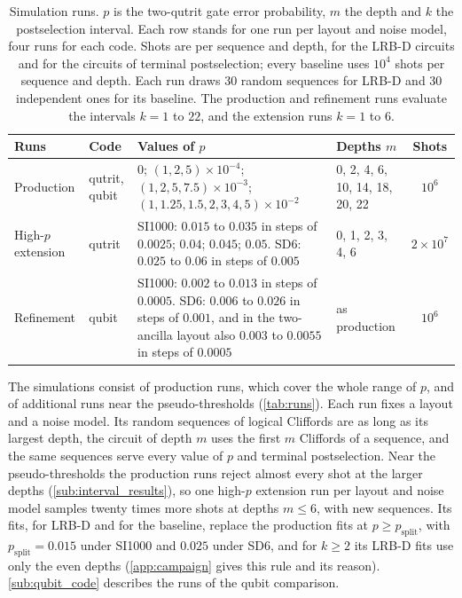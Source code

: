 \begin{table}[tb]
  \centering
  \small
  \begin{tabular}{l|l|p{6.0cm}|p{2.7cm}|c}
    \hline
    Runs & Code & Values of $p$ & Depths $m$ & Shots \\
    \hline
    Production & qutrit, qubit & $0$; $(1, 2, 5)\times10^{-4}$; $(1, 2, 5, 7.5)\times10^{-3}$; $(1, 1.25, 1.5, 2, 3, 4, 5)\times10^{-2}$ & 0, 2, 4, 6, 10, 14, 18, 20, 22 & $10^6$ \\
    High-$p$ extension & qutrit & SI1000: $0.015$ to $0.035$ in steps of $0.0025$; $0.04$; $0.045$; $0.05$. SD6: $0.025$ to $0.06$ in steps of $0.005$ & 0, 1, 2, 3, 4, 6 & $2\times10^7$ \\
    Refinement & qubit & SI1000: $0.002$ to $0.013$ in steps of $0.0005$. SD6: $0.006$ to $0.026$ in steps of $0.001$, and in the two-ancilla layout also $0.003$ to $0.0055$ in steps of $0.0005$ & as production & $10^6$ \\
    \hline
  \end{tabular}
  \caption{Simulation runs. $p$ is the two-qutrit gate error probability, $m$ the depth and $k$ the postselection interval. Each row stands for one run per layout and noise model, four runs for each code. Shots are per sequence and depth, for the LRB-D circuits and for the circuits of terminal postselection; every baseline uses $10^4$ shots per sequence and depth. Each run draws 30 random sequences for LRB-D and 30 independent ones for its baseline. The production and refinement runs evaluate the intervals $k = 1$ to $22$, and the extension runs $k = 1$ to $6$.}
  \label{tab:runs}
\end{table}

The simulations consist of production runs, which cover the whole range of $p$, and of additional runs near the pseudo-thresholds (\autoref{tab:runs}). Each run fixes a layout and a noise model. Its random sequences of logical Cliffords are as long as its largest depth, the circuit of depth $m$ uses the first $m$ Cliffords of a sequence, and the same sequences serve every value of $p$ and terminal postselection. Near the pseudo-thresholds the production runs reject almost every shot at the larger depths (\autoref{sub:interval_results}), so one high-$p$ extension run per layout and noise model samples twenty times more shots at depths $m \le 6$, with new sequences. Its fits, for LRB-D and for the baseline, replace the production fits at $p \ge p_{\mathrm{split}}$, with $p_{\mathrm{split}} = 0.015$ under SI1000 and $0.025$ under SD6, and for $k \ge 2$ its LRB-D fits use only the even depths (\autoref{app:campaign} gives this rule and its reason). \autoref{sub:qubit_code} describes the runs of the qubit comparison.
